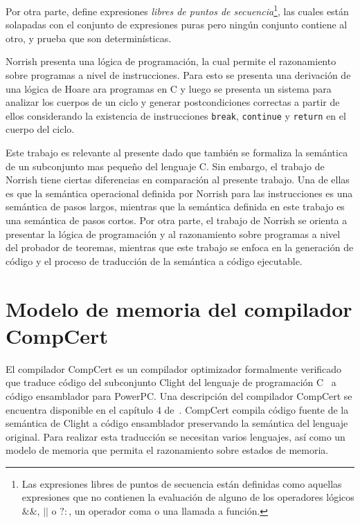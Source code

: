 Por otra parte, define expresiones \textit{libres de puntos de secuencia}\footnote{Las expresiones libres de puntos de secuencia están definidas como aquellas expresiones que no contienen la evaluación de alguno de los operadores lógicos $\&\&$, $||$ o $?:$, un operador coma o una llamada a función.}, las cuales están solapadas con el conjunto de expresiones puras pero ningún conjunto contiene al otro, y prueba que son determinísticas.

Norrish presenta una lógica de programación, la cual permite el razonamiento sobre programas a nivel de instrucciones.
Para esto se presenta una derivación de una lógica de Hoare ara programas en C y luego se presenta un sistema para analizar los cuerpos de un ciclo y generar postcondiciones correctas a partir de ellos considerando la existencia de instrucciones \verb|break|, \verb|continue| y \verb|return| en el cuerpo del ciclo.

Este trabajo es relevante al presente dado que también se formaliza la semántica de un subconjunto mas pequeño del lenguaje C.
Sin embargo, el trabajo de Norrish tiene ciertas diferencias en comparación al presente trabajo.
Una de ellas es que la semántica operacional definida por Norrish para las instrucciones es una semántica de pasos largos, mientras que la semántica definida en este trabajo es una semántica de pasos cortos.
Por otra parte, el trabajo de Norrish se orienta a presentar la lógica de programación y al razonamiento sobre programas a nivel del probador de teoremas, mientras que este trabajo se enfoca en la generación de código y el proceso de traducción de la semántica a código ejecutable.

\section{Modelo de memoria del compilador CompCert}

El compilador CompCert es un compilador optimizador formalmente verificado que traduce código del subconjunto Clight del lenguaje de programación C~\cite{clight} a código ensamblador para PowerPC.
Una descripción del compilador CompCert se encuentra disponible en el capítulo 4 de~\cite{compcert-float-point}.
CompCert compila código fuente de la semántica de Clight a código ensamblador preservando la semántica del lenguaje original.
Para realizar esta traducción se necesitan varios lenguajes, así como un modelo de memoria que permita el razonamiento sobre estados de memoria.

